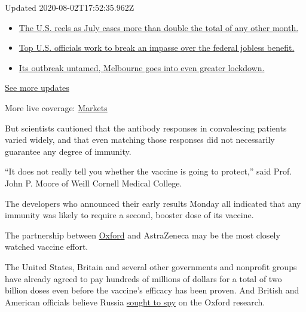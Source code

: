 Updated 2020-08-02T17:52:35.962Z

\begin{itemize}
\tightlist
\item
  \href{https://www.nytimes.com/2020/08/01/world/coronavirus-covid-19.html?action=click\&pgtype=Article\&state=default\&region=MAIN_CONTENT_1\&context=storylines_live_updates\#link-34047410}{The
  U.S. reels as July cases more than double the total of any other
  month.}
\item
  \href{https://www.nytimes.com/2020/08/01/world/coronavirus-covid-19.html?action=click\&pgtype=Article\&state=default\&region=MAIN_CONTENT_1\&context=storylines_live_updates\#link-780ec966}{Top
  U.S. officials work to break an impasse over the federal jobless
  benefit.}
\item
  \href{https://www.nytimes.com/2020/08/01/world/coronavirus-covid-19.html?action=click\&pgtype=Article\&state=default\&region=MAIN_CONTENT_1\&context=storylines_live_updates\#link-2bc8948}{Its
  outbreak untamed, Melbourne goes into even greater lockdown.}
\end{itemize}

\href{https://www.nytimes.com/2020/08/01/world/coronavirus-covid-19.html?action=click\&pgtype=Article\&state=default\&region=MAIN_CONTENT_1\&context=storylines_live_updates}{See
more updates}

More live coverage:
\href{https://www.nytimes.com/live/2020/07/31/business/stock-market-today-coronavirus?action=click\&pgtype=Article\&state=default\&region=MAIN_CONTENT_1\&context=storylines_live_updates}{Markets}

But scientists cautioned that the antibody responses in convalescing
patients varied widely, and that even matching those responses did not
necessarily guarantee any degree of immunity.

``It does not really tell you whether the vaccine is going to protect,''
said Prof. John P. Moore of Weill Cornell Medical College.

The developers who announced their early results Monday all indicated
that any immunity was likely to require a second, booster dose of its
vaccine.

The partnership between
\href{https://www.nytimes.com/2020/04/27/world/europe/coronavirus-vaccine-update-oxford.html}{Oxford}
and AstraZeneca may be the most closely watched vaccine effort.

The United States, Britain and several other governments and nonprofit
groups have already agreed to pay hundreds of millions of dollars for a
total of two billion doses even before the vaccine's efficacy has been
proven. And British and American officials believe Russia
\href{https://www.nytimes.com/2020/07/16/us/politics/vaccine-hacking-russia.html}{sought
to spy} on the Oxford research.


